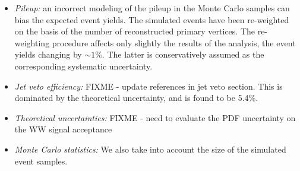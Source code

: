 \begin{itemize}
  \begin{itemize}
  \item Jet induced backgrounds, $\Wjets$ and $QCD$: the associated systematic
    uncertainty is 36\%.
  \item Top background: this background is estimated using $b$-tagged events and
    the $b$-tagging efficiency, which is measured in control regions in data.
    The associated systematic uncertainties are below $5\%$,
    while the statistical component is about $25\%$ for $\intlumi$.
  \item Drell-Yan background: The uncertainty arises from the limited knowledge of
    events with large $\met$ tails.
    We conservatively quantify such uncertainty from the variation of the ratio $R_{out/in}$
    (Eq.\ref{eq:dyest}) as a function of the $\met$ requirement,
    leading to an estimate of about $125\%$.
    As very few $\dyll$ events are selected, this has anyhow a small affect on the final analysis results ($\sim xxx\%$).
  \item Other backgrounds: The sub-dominant backgrounds are estimated from simulation
    with appropriate systematic uncertainties on their cross section.
    We take $3\%$ for $\WZ$ and $\ZZ$ events and $10\%$ for $W+\gamma$ events.
    These uncertainties must be augmented by the luminosity normalization uncertainty.
  \end{itemize}

\item {\it Pileup:} an incorrect modeling of the pileup in the Monte Carlo samples
can bias the expected event yields. The simulated events have been re-weighted
on the basis of the number of reconstructed
primary vertices. The re-weighting procedure affects only slightly the results of the analysis,
the event yields changing by $\sim1\%$. The latter is conservatively assumed as
the corresponding systematic uncertainty.

\item {\it Jet veto efficiency:}
FIXME - update references in jet veto section.
This is dominated by the theoretical uncertainty, and is found to be 5.4\%.

\item {\it Theoretical uncertainties:}
FIXME - need to evaluate the PDF uncertainty on the WW signal acceptance

\item {\it Monte Carlo statistics:} We also take into account the
size of the simulated event samples. 
\end{itemize}

